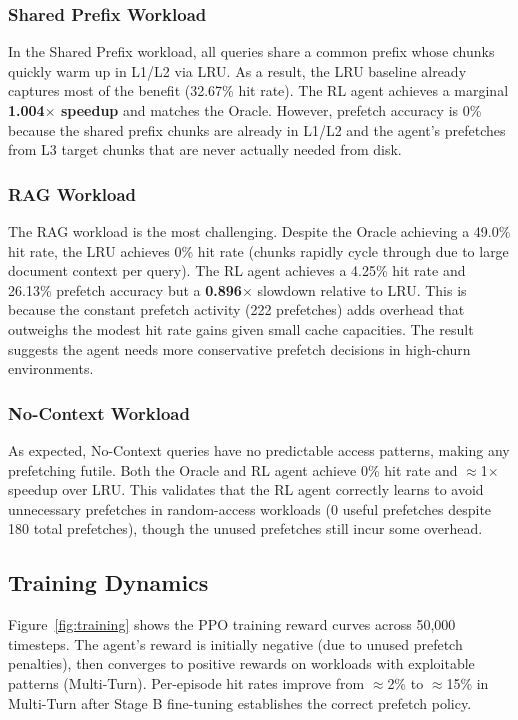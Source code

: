 \documentclass[conference]{IEEEtran}
\begin{document}
\subsubsection{Shared Prefix Workload}

In the Shared Prefix workload, all queries share a common prefix whose chunks quickly warm up in L1/L2 via LRU. As a result, the LRU baseline already captures most of the benefit (32.67\% hit rate). The RL agent achieves a marginal \textbf{1.004$\times$ speedup} and matches the Oracle. However, prefetch accuracy is 0\% because the shared prefix chunks are already in L1/L2 and the agent's prefetches from L3 target chunks that are never actually needed from disk.

\subsubsection{RAG Workload}

The RAG workload is the most challenging. Despite the Oracle achieving a 49.0\% hit rate, the LRU achieves 0\% hit rate (chunks rapidly cycle through due to large document context per query). The RL agent achieves a 4.25\% hit rate and 26.13\% prefetch accuracy but a \textbf{0.896$\times$} slowdown relative to LRU. This is because the constant prefetch activity (222 prefetches) adds overhead that outweighs the modest hit rate gains given small cache capacities. The result suggests the agent needs more conservative prefetch decisions in high-churn environments.

\subsubsection{No-Context Workload}

As expected, No-Context queries have no predictable access patterns, making any prefetching futile. Both the Oracle and RL agent achieve 0\% hit rate and $\approx$1$\times$ speedup over LRU. This validates that the RL agent correctly learns to avoid unnecessary prefetches in random-access workloads (0 useful prefetches despite 180 total prefetches), though the unused prefetches still incur some overhead.

\subsection{Training Dynamics}

Figure~\ref{fig:training} shows the PPO training reward curves across 50,000 timesteps. The agent's reward is initially negative (due to unused prefetch penalties), then converges to positive rewards on workloads with exploitable patterns (Multi-Turn). Per-episode hit rates improve from $\approx$2\% to $\approx$15\% in Multi-Turn after Stage B fine-tuning establishes the correct prefetch policy.
\end{document}
